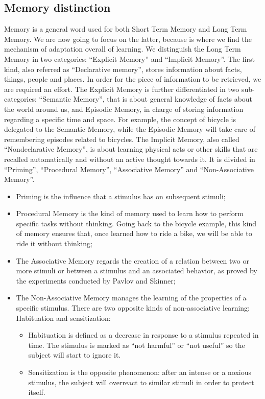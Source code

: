 \documentclass[conference]{IEEEtran}
\begin{document}
	\subsection{Memory distinction}\label{MD}
		Memory is a general word used for both Short Term Memory and Long Term Memory. We are now going to focus on the latter, because is where we find the mechanism of adaptation overall of learning.
		We distinguish the Long Term Memory in two categories: ``Explicit Memory'' and ``Implicit Memory''.
		The first kind, also referred as ``Declarative memory'',  stores information about facts, things, people and places. In order for the piece of information to be retrieved, we are required an effort.
		The Explicit Memory is further differentiated in two sub-categories: ``Semantic Memory'', that is about general knowledge of facts about the world around us, and Episodic Memory, in charge of storing information regarding a specific time and space.
		For example, the concept of bicycle is delegated to the Semantic Memory, while the Episodic Memory will take care of remembering episodes related to bicycles.
		The Implicit Memory, also called ``Nondeclarative Memory'', is about learning physical acts or other skills that are recalled automatically and without an active thought towards it.
		It is divided in ``Priming'', ``Procedural Memory'', ``Associative Memory'' and ``Non-Associative Memory''.
		\begin{itemize}
			\item Priming is the influence that a stimulus has on subsequent stimuli;
			\item Procedural Memory is the kind of memory used to learn how to perform specific tasks without thinking. Going back to the bicycle example, this kind of memory ensures that, once learned how to ride a bike, we will be able to ride it without thinking;
			\item The Associative Memory regards the creation of a relation between two or more stimuli or between a stimulus and an associated behavior, as proved by the experiments conducted by Pavlov and Skinner;
			\item The Non-Associative Memory manages the learning of the properties of a specific stimulus. There are two opposite kinds of non-associative learning: Habituation and sensitization:
			\begin{itemize}
				\item Habituation is defined as a decrease in response to a stimulus repeated in time. The stimulus is marked as ``not harmful'' or ``not useful'' so the subject will start to ignore it.
				\item Sensitization is the opposite phenomenon: after an intense or a noxious stimulus, the subject will overreact to similar stimuli in order to protect itself.
			\end{itemize}
		\end{itemize}
\end{document}

